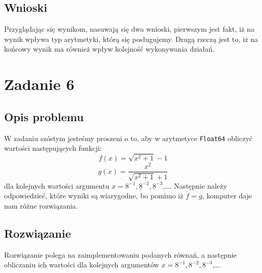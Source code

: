 \documentclass{article}
\begin{document}
\begin{center}
    \subsection{Wnioski}
    \large Przyglądając się wynikom, nasuwają się dwa wnioski, pierwszym jest fakt, iż na wynik wpływa typ arytmetyki, którą się posługujemy.
     Drugą rzeczą jest to, iż na końcowy wynik ma również wpływ kolejność wykonywania działań.
    \section{Zadanie 6}
    \subsection{Opis problemu}
    \large W zadaniu szóstym jesteśmy proszeni o to, aby w arytmetyce \texttt{Float64} obliczyć wartości następujących funkcji:
     \[\displaystyle f(x) = \sqrt{x^2 + 1} - 1\]
     \[\displaystyle g(x) = \frac{x^2}{\sqrt{x^2 + 1} + 1}\]
     dla kolejnych wartości argumentu \(x = 8^{-1},8^{-2},8^{-3}\),\ldots.
     Następnie należy odpowiedzieć, które wyniki są wiarygodne, bo pomimo iż \(f=g\), komputer daje nam różne rozwiązania.
    \subsection{Rozwiązanie}
    \large Rozwiązanie polega na zaimplementowaniu podanych równań, a następnie obliczaniu ich wartości dla kolejnych argumentów \(x = 8^{-1},8^{-2},8^{-3}\),\ldots.

\end{center}
\end{document}
